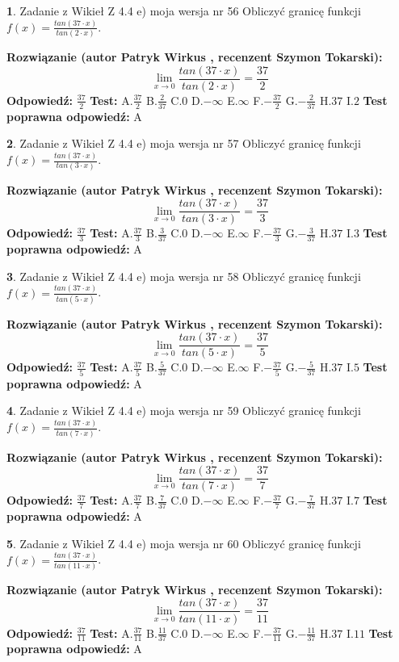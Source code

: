 \documentclass[12pt, a4paper]{article}
\theoremstyle{definition} %
\newtheorem{zad}{}
\newcommand{\zadStart}[1]{\begin{zad}#1\newline}
\newcommand{\zadStop}{\end{zad}}
\newcommand{\rozwStart}[2]{\noindent \textbf{Rozwiązanie (autor #1 , recenzent #2): }\newline}
\newcommand{\rozwStop}{\newline}
\newcommand{\odpStart}{\noindent \textbf{Odpowiedź:}\newline}
\newcommand{\odpStop}{\newline}
\newcommand{\testStart}{\noindent \textbf{Test:}\newline}
\newcommand{\testStop}{\newline}
\newcommand{\kluczStart}{\noindent \textbf{Test poprawna odpowiedź:}\newline}
\newcommand{\kluczStop}{\newline}
\begin{document}
\zadStart{Zadanie z Wikieł Z 4.4 e) moja wersja nr 56}
Obliczyć granicę funkcji $f(x)=\frac{tan(37\cdot x)}{tan(2\cdot x)}$.
\zadStop
\rozwStart{Patryk Wirkus}{Szymon Tokarski}
$$\lim\limits_{x\to 0}\frac{tan(37\cdot x)}{tan(2\cdot x)}=
\frac{37}{2}$$
\rozwStop
\odpStart
$\frac{37}{2}$
\odpStop
\testStart
A.$\frac{37}{2}$
B.$\frac{2}{37}$
C.$0$
D.$-\infty$
E.$\infty$
F.$-\frac{37}{2}$
G.$-\frac{2}{37}$
H.$37$
I.$2$
\testStop
\kluczStart
A
\kluczStop



\zadStart{Zadanie z Wikieł Z 4.4 e) moja wersja nr 57}
Obliczyć granicę funkcji $f(x)=\frac{tan(37\cdot x)}{tan(3\cdot x)}$.
\zadStop
\rozwStart{Patryk Wirkus}{Szymon Tokarski}
$$\lim\limits_{x\to 0}\frac{tan(37\cdot x)}{tan(3\cdot x)}=
\frac{37}{3}$$
\rozwStop
\odpStart
$\frac{37}{3}$
\odpStop
\testStart
A.$\frac{37}{3}$
B.$\frac{3}{37}$
C.$0$
D.$-\infty$
E.$\infty$
F.$-\frac{37}{3}$
G.$-\frac{3}{37}$
H.$37$
I.$3$
\testStop
\kluczStart
A
\kluczStop



\zadStart{Zadanie z Wikieł Z 4.4 e) moja wersja nr 58}
Obliczyć granicę funkcji $f(x)=\frac{tan(37\cdot x)}{tan(5\cdot x)}$.
\zadStop
\rozwStart{Patryk Wirkus}{Szymon Tokarski}
$$\lim\limits_{x\to 0}\frac{tan(37\cdot x)}{tan(5\cdot x)}=
\frac{37}{5}$$
\rozwStop
\odpStart
$\frac{37}{5}$
\odpStop
\testStart
A.$\frac{37}{5}$
B.$\frac{5}{37}$
C.$0$
D.$-\infty$
E.$\infty$
F.$-\frac{37}{5}$
G.$-\frac{5}{37}$
H.$37$
I.$5$
\testStop
\kluczStart
A
\kluczStop



\zadStart{Zadanie z Wikieł Z 4.4 e) moja wersja nr 59}
Obliczyć granicę funkcji $f(x)=\frac{tan(37\cdot x)}{tan(7\cdot x)}$.
\zadStop
\rozwStart{Patryk Wirkus}{Szymon Tokarski}
$$\lim\limits_{x\to 0}\frac{tan(37\cdot x)}{tan(7\cdot x)}=
\frac{37}{7}$$
\rozwStop
\odpStart
$\frac{37}{7}$
\odpStop
\testStart
A.$\frac{37}{7}$
B.$\frac{7}{37}$
C.$0$
D.$-\infty$
E.$\infty$
F.$-\frac{37}{7}$
G.$-\frac{7}{37}$
H.$37$
I.$7$
\testStop
\kluczStart
A
\kluczStop



\zadStart{Zadanie z Wikieł Z 4.4 e) moja wersja nr 60}
Obliczyć granicę funkcji $f(x)=\frac{tan(37\cdot x)}{tan(11\cdot x)}$.
\zadStop
\rozwStart{Patryk Wirkus}{Szymon Tokarski}
$$\lim\limits_{x\to 0}\frac{tan(37\cdot x)}{tan(11\cdot x)}=
\frac{37}{11}$$
\rozwStop
\odpStart
$\frac{37}{11}$
\odpStop
\testStart
A.$\frac{37}{11}$
B.$\frac{11}{37}$
C.$0$
D.$-\infty$
E.$\infty$
F.$-\frac{37}{11}$
G.$-\frac{11}{37}$
H.$37$
I.$11$
\testStop
\kluczStart
A
\kluczStop
\end{document}
